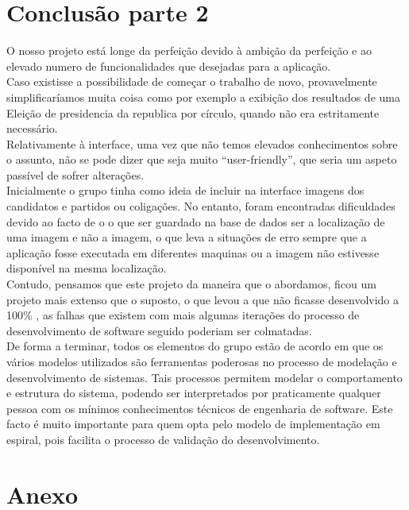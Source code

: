 \documentclass[a4paper,12pt]{report}
\begin{document}
\section{Conclusão parte 2}
O nosso projeto está longe da perfeição devido à ambição da perfeição e ao elevado numero de funcionalidades que desejadas para a aplicação. 
\\\indent Caso existisse a possibilidade de começar o trabalho de novo, provavelmente simplificaríamos muita coisa como por exemplo a exibição dos resultados de uma Eleição de presidencia da republica por círculo, quando não era estritamente necessário.
\\\indent Relativamente à interface, uma vez que não temos elevados conhecimentos sobre o assunto, não se pode dizer que seja muito ``user-friendly'', que seria um aspeto passível de sofrer alterações.
\\\indent Inicialmente o grupo tinha como ideia de incluir na interface imagens dos candidatos e partidos ou coligações. No entanto, foram encontradas dificuldades devido ao facto de o o que ser guardado na base de dados ser a localização de uma imagem e não a imagem, o que leva a situações de erro sempre que a aplicação fosse executada em diferentes maquinas ou a imagem não estivesse disponível na mesma localização.
\\\indent Contudo, pensamos que este projeto da maneira que o abordamos, ficou um projeto mais extenso que o suposto, o que levou a que não ficasse desenvolvido a 100\% , as falhas que existem com mais algumas iterações do processo de desenvolvimento de software seguido poderiam ser colmatadas.
\\\indent De forma a terminar, todos os elementos do grupo estão de acordo em que os vários modelos utilizados são ferramentas poderosas no processo de modelação e desenvolvimento de sistemas. Tais processos permitem modelar o comportamento e estrutura do sistema, podendo ser interpretados por praticamente qualquer pessoa com os mínimos conhecimentos técnicos de engenharia de software. Este facto é muito importante para quem opta pelo modelo de implementação em espiral, pois facilita o processo de validação do desenvolvimento.


\newpage
\appendix
\section{Anexo}
\end{document}
